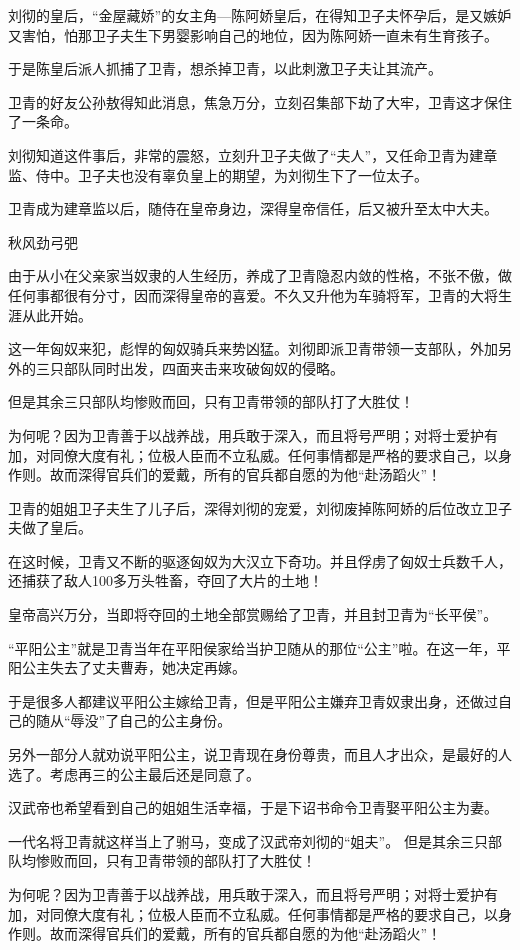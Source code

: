 \documentclass[UTF8,cap,nofonts,openany,twoside]{ctexbook}
\begin{document}
刘彻的皇后，“金屋藏娇”的女主角---陈阿娇皇后，在得知卫子夫怀孕后，是又嫉妒又害怕，怕那卫子夫生下男婴影响自己的地位，因为陈阿娇一直未有生育孩子。

于是陈皇后派人抓捕了卫青，想杀掉卫青，以此刺激卫子夫让其流产。

卫青的好友公孙敖得知此消息，焦急万分，立刻召集部下劫了大牢，卫青这才保住了一条命。

刘彻知道这件事后，非常的震怒，立刻升卫子夫做了“夫人”，又任命卫青为建章监、侍中。卫子夫也没有辜负皇上的期望，为刘彻生下了一位太子。

卫青成为建章监以后，随侍在皇帝身边，深得皇帝信任，后又被升至太中大夫。

秋风劲弓弝

由于从小在父亲家当奴隶的人生经历，养成了卫青隐忍内敛的性格，不张不傲，做任何事都很有分寸，因而深得皇帝的喜爱。不久又升他为车骑将军，卫青的大将生涯从此开始。

这一年匈奴来犯，彪悍的匈奴骑兵来势凶猛。刘彻即派卫青带领一支部队，外加另外的三只部队同时出发，四面夹击来攻破匈奴的侵略。

但是其余三只部队均惨败而回，只有卫青带领的部队打了大胜仗！

为何呢？因为卫青善于以战养战，用兵敢于深入，而且将号严明；对将士爱护有加，对同僚大度有礼；位极人臣而不立私威。任何事情都是严格的要求自己，以身作则。故而深得官兵们的爱戴，所有的官兵都自愿的为他“赴汤蹈火”！

卫青的姐姐卫子夫生了儿子后，深得刘彻的宠爱，刘彻废掉陈阿娇的后位改立卫子夫做了皇后。

在这时候，卫青又不断的驱逐匈奴为大汉立下奇功。并且俘虏了匈奴士兵数千人，还捕获了敌人100多万头牲畜，夺回了大片的土地！

皇帝高兴万分，当即将夺回的土地全部赏赐给了卫青，并且封卫青为“长平侯”。

“平阳公主”就是卫青当年在平阳侯家给当护卫随从的那位“公主”啦。在这一年，平阳公主失去了丈夫曹寿，她决定再嫁。

于是很多人都建议平阳公主嫁给卫青，但是平阳公主嫌弃卫青奴隶出身，还做过自己的随从“辱没”了自己的公主身份。

另外一部分人就劝说平阳公主，说卫青现在身份尊贵，而且人才出众，是最好的人选了。考虑再三的公主最后还是同意了。

汉武帝也希望看到自己的姐姐生活幸福，于是下诏书命令卫青娶平阳公主为妻。

一代名将卫青就这样当上了驸马，变成了汉武帝刘彻的“姐夫”。
\newpage
但是其余三只部队均惨败而回，只有卫青带领的部队打了大胜仗！

为何呢？因为卫青善于以战养战，用兵敢于深入，而且将号严明；对将士爱护有加，对同僚大度有礼；位极人臣而不立私威。任何事情都是严格的要求自己，以身作则。故而深得官兵们的爱戴，所有的官兵都自愿的为他“赴汤蹈火”！
\end{document}
